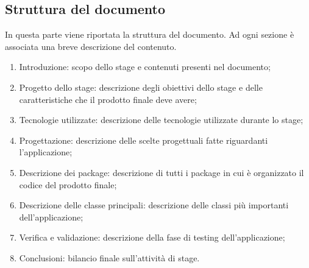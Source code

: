 \documentclass[../Tesi.tex]{subfiles}
\begin{document}
	\subsection{Struttura del documento}
		In questa parte viene riportata la struttura del documento. Ad ogni sezione è associata una breve descrizione del contenuto.
		\begin{enumerate}
			\item Introduzione: scopo dello stage e contenuti presenti nel documento;
			\item Progetto dello stage: descrizione degli obiettivi dello stage e delle caratteristiche che il prodotto finale deve avere;
			\item Tecnologie utilizzate: descrizione delle tecnologie utilizzate durante lo stage;
			\item Progettazione: descrizione delle scelte progettuali fatte riguardanti l'applicazione;
			\item Descrizione dei package: descrizione di tutti i package in cui è organizzato il codice del prodotto finale;
			\item Descrizione delle classe principali: descrizione delle classi più importanti dell'applicazione;
			\item Verifica e validazione: descrizione della fase di testing dell'applicazione;
			\item Conclusioni: bilancio finale sull'attività di stage.
		\end{enumerate}
\end{document}
